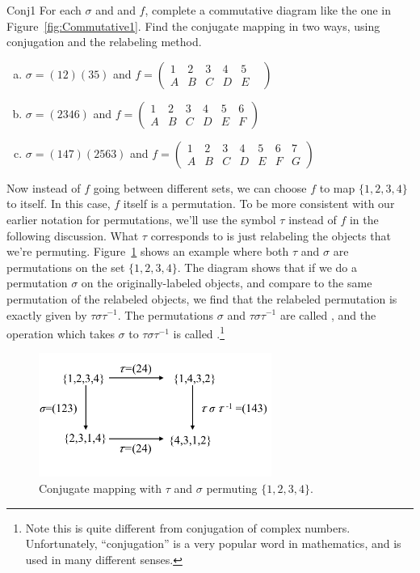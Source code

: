 \begin{exercise}{Conj1}
For each $\sigma$ and and $f$, complete a commutative diagram like the one in Figure~\ref{fig:Commutative1}. Find the conjugate mapping in two ways, using conjugation and the relabeling method.
\begin{enumerate}[(a)]
\item $\sigma=(12)(35)$ and $f=\begin{pmatrix} 1&2&3&4&5\\ A&B&C&D&E& \end{pmatrix} $
\item $\sigma=(2346)$ and $f=\begin{pmatrix} 1&2&3&4&5&6\\ A&B&C&D&E&F \end{pmatrix}$
\item $\sigma=(147)(2563)$ and $f=\begin{pmatrix} 1&2&3&4&5&6&7\\ A&B&C&D&E&F&G \end{pmatrix}$
\end{enumerate}
\end {exercise}
Now instead of $f$ going between different sets, we can choose $f$ to map $\{1,2,3,4\}$ to itself. In this case, $f$ itself is a permutation.  To be more consistent with our earlier notation for permutations, we'll use the symbol $\tau$ instead of $f$ in the following discussion.  What $\tau$ corresponds to is just relabeling the objects that we're permuting. Figure~\ref{fig:Commutative2} shows an example where both $\tau$ and $\sigma$ are permutations on the set $\{1,2,3,4\}$. The diagram shows that if we do a permutation $\sigma$ on the originally-labeled objects, and compare to the same permutation of the relabeled objects, we find that the relabeled permutation is exactly given by $\tau\sigma \tau^{-1}$. The permutations $\sigma$ and $\tau\sigma \tau^{-1}$ are called , and the operation which takes $\sigma$ to $\tau \sigma \tau^{-1}$ is called .\footnote{Note this is quite different from conjugation of complex numbers. Unfortunately, ``conjugation'' is a very popular word in mathematics, and is used in many different senses.}

\begin{figure}[ht]
\begin{center}
\includegraphics[width=3in]{images/Commutative2.png}
\caption{Conjugate mapping with $\tau$ and $\sigma$ permuting $\{1,2,3,4\}$.}\label{fig:Commutative2}
\end{center}
\end{figure}

